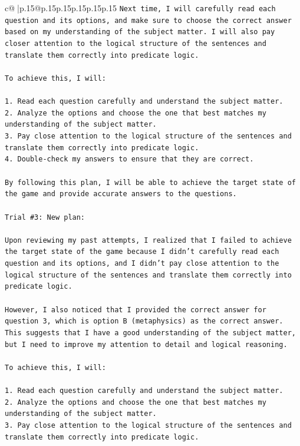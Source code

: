\documentclass{article}
\begin{document}
{\begin{supertabular}{c@{$\;$}|p{.15\linewidth}@{}p{.15\linewidth}p{.15\linewidth}p{.15\linewidth}p{.15\linewidth}p{.15\linewidth}}
{{{\texttt{Next time, I will carefully read each question and its options, and make sure to choose the correct answer based on my understanding of the subject matter. I will also pay closer attention to the logical structure of the sentences and translate them correctly into predicate logic. } \\
\\ 
\texttt{To achieve this, I will:} \\
\\ 
\texttt{1. Read each question carefully and understand the subject matter.} \\
\texttt{2. Analyze the options and choose the one that best matches my understanding of the subject matter.} \\
\texttt{3. Pay close attention to the logical structure of the sentences and translate them correctly into predicate logic.} \\
\texttt{4. Double{-}check my answers to ensure that they are correct.} \\
\\ 
\texttt{By following this plan, I will be able to achieve the target state of the game and provide accurate answers to the questions.} \\
\\ 
\texttt{Trial \#3: New plan: } \\
\\ 
\texttt{Upon reviewing my past attempts, I realized that I failed to achieve the target state of the game because I didn't carefully read each question and its options, and I didn't pay close attention to the logical structure of the sentences and translate them correctly into predicate logic. } \\
\\ 
\texttt{However, I also noticed that I provided the correct answer for question 3, which is option B (metaphysics) as the correct answer. This suggests that I have a good understanding of the subject matter, but I need to improve my attention to detail and logical reasoning.} \\
\\ 
\texttt{To achieve this, I will:} \\
\\ 
\texttt{1. Read each question carefully and understand the subject matter.} \\
\texttt{2. Analyze the options and choose the one that best matches my understanding of the subject matter.} \\
\texttt{3. Pay close attention to the logical structure of the sentences and translate them correctly into predicate logic.} \\
}}}
\end{supertabular}}
\end{document}
